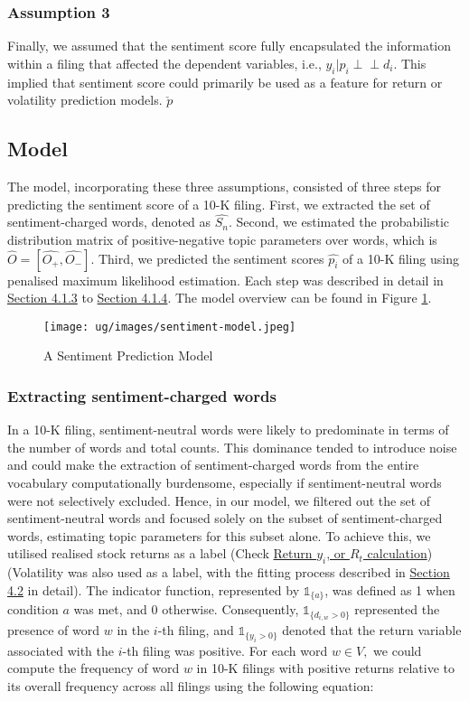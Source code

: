 \documentclass[logo,bsc,singlespacing,parskip]{infthesis}
\begin{document}
\subsubsection{Assumption 3}
Finally, we assumed that the sentiment score fully encapsulated the information within a filing that affected the dependent variables, i.e., $y_i|p_i \perp \!\!\! \perp   d_i$. This implied that sentiment score could primarily be used as a feature for return or volatility prediction models. $\check{p}$

\subsection{Model}
\label{subsec:model}
The model, incorporating these three assumptions, consisted of three steps for predicting the sentiment score of a 10-K filing. First, we extracted the set of sentiment-charged words, denoted as $\hat{S_n}$. Second, we estimated the probabilistic distribution matrix of positive-negative topic parameters over words, which is $\hat{O}=[\hat{O_+},\hat{O_-}]$. Third, we predicted the sentiment scores $\hat{p_i}$ of a 10-K filing using penalised maximum likelihood estimation. Each step was described in detail in \hyperref[subsec:model]{Section 4.1.3} to \hyperref[subsec:new_filings]{Section 4.1.4}. The model overview can be found in Figure \ref{fig:sentiment-model}.

\begin{figure}[h!]
    \centering
    \texttt{[image: ug/images/sentiment-model.jpeg]}
    \caption{A Sentiment Prediction Model}
    \label{fig:sentiment-model}
\end{figure}

\subsubsection{Extracting sentiment-charged words}
In a 10-K filing, sentiment-neutral words were likely to predominate in terms of the number of words and total counts. This dominance tended to introduce noise and could make the extraction of sentiment-charged words from the entire vocabulary computationally burdensome, especially if sentiment-neutral words were not selectively excluded. Hence, in our model, we filtered out the set of sentiment-neutral words and focused solely on the subset of sentiment-charged words, estimating topic parameters for this subset alone. To achieve this, we utilised realised stock returns as a label (Check \hyperref[subsubsubsec:return_calculation]{Return $y_i$, or $R_t$ calculation}) (Volatility was also used as a label, with the fitting process described in \hyperref[sec:volatility_label]{Section 4.2} in detail). The indicator function, represented by $\mathbb{1}_{\{a\}}$, was defined as 1 when condition $a$ was met, and 0 otherwise. Consequently, $\mathbb{1}_{\{d_{i,w} > 0\}}$ represented the presence of word $w$ in the $i$-th filing, and $\mathbb{1}_{\{y_i > 0\}}
$ denoted that the return variable associated with the $i$-th filing was positive. For each word $w \in V,$ we could compute the frequency of word $w$ in 10-K filings with positive returns relative to its overall frequency across all filings using the following equation: 
\end{document}

